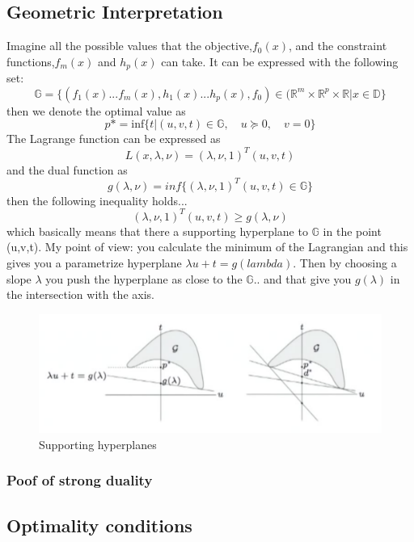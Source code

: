 \subsection{Geometric Interpretation}
Imagine all the possible values that the objective,$f_0(x)$, and the constraint functions,$f_m(x)$ and $h_p(x)$ can take. It can be expressed with the following set:
$$\mathbb{G} =\{(f_1(x)...f_m(x),h_1(x)...h_p(x),f_0)\in \mathbb(\mathbb{R}^m\times\mathbb{R}^p\times\mathbb{R} | x \in \mathbb{D}\}$$
then we denote the optimal value as
$$p* = \text{inf}\{t | (u,v,t) \in \mathbb{G},\quad u \succeq 0,\quad v=0\}$$
The Lagrange function can be expressed as 
$$L(x,\lambda,\nu) = (\lambda,\nu,1)^T(u,v,t) $$
and the dual function as
$$g(\lambda,\nu) = inf\{(\lambda,\nu,1)^T(u,v,t) \in \mathbb{G}\}$$
then the following inequality holds...
$$(\lambda,\nu,1)^T(u,v,t)\geq g(\lambda,\nu)$$
which basically means that there a supporting hyperplane to $\mathbb{G}$ in the point (u,v,t). My point of view: you calculate the minimum of the Lagrangian and this gives you a parametrize hyperplane $\lambda u + t = g(lambda)$. Then by choosing a slope $\lambda$ you push the hyperplane as close to the $\mathbb{G}$.. and that give you $g(\lambda)$ in the intersection with the axis. 

\begin{figure}
\centering
\includegraphics[width=1\textwidth]{images/supporthyperplanes.png}
\caption{Supporting hyperplanes}
\end{figure}
\subsubsection{Poof of strong duality}
\subsection{Optimality conditions}
